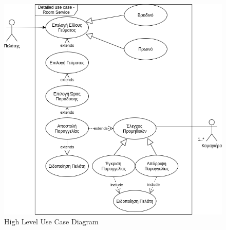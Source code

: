 \begin{figure}[H]
	\centering
	\includegraphics[width=1\textwidth]{Images/Low_level_use_case-Room service}
	\caption{High Level Use Case Diagram}
	\label{Low level use case - Room service}
\end{figure}

